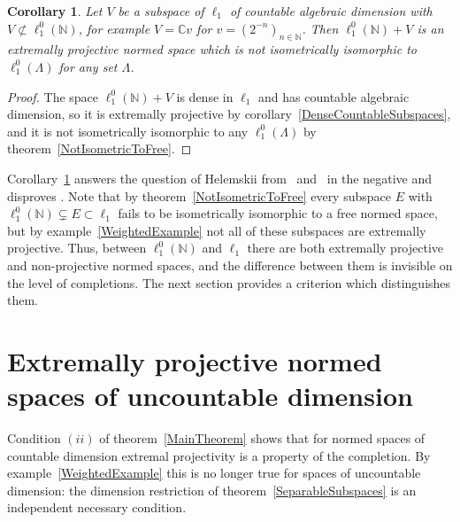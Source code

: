 \documentclass[12pt]{article}
\newtheorem{corollary}[theorem]{Corollary}
\newcommand{\lo}[1]{\ell_1^0(#1)}
\begin{document}
\begin{corollary}\label{CounterexampleCorollary} Let $V$ be a subspace of
    $\ell_1$ of countable algebraic dimension with $V\not\subset\lo{\mathbb{N}}$,
    for example $V=\mathbb{C}v$ for $v={(2^{-n})}_{n\in\mathbb{N}}$. Then
    $\lo{\mathbb{N}}+V$ is an extremally projective normed space which is not
    isometrically isomorphic to $\lo{\Lambda}$ for any set $\Lambda$.
\end{corollary}
\begin{proof} The space $\lo{\mathbb{N}}+V$ is dense in $\ell_1$ and has
    countable algebraic dimension, so it is extremally projective by
    corollary~\ref{DenseCountableSubspaces}, and it is not isometrically
    isomorphic to any $\lo{\Lambda}$ by theorem~\ref{NotIsometricToFree}.
\end{proof}

Corollary~\ref{CounterexampleCorollary} answers the question of Helemskii
from~\cite[section 2]{HelExtrProjSeqAlg} and~\cite[section 1]{HelMetrFrQMod}
in the negative and disproves \cite[conjecture 3.1]{GronLiftProbNormSp}. Note
that by theorem~\ref{NotIsometricToFree} every subspace
$E$ with $\lo{\mathbb{N}}\subsetneq E\subset\ell_1$ fails to be isometrically
isomorphic to a free normed space, but by example~\ref{WeightedExample} not
all of these subspaces are extremally projective. Thus, between
$\lo{\mathbb{N}}$ and $\ell_1$ there are both extremally projective and
non-projective normed spaces, and the difference between them is invisible on
the level of completions. The next section provides a criterion which
distinguishes them.


\section{Extremally projective normed spaces of uncountable
  dimension}\label{SectionUncountable}

Condition $(ii)$ of theorem~\ref{MainTheorem} shows that for normed spaces of
countable dimension extremal projectivity is a property of the completion. By
example~\ref{WeightedExample} this is no longer true for spaces of uncountable
dimension: the dimension restriction of theorem~\ref{SeparableSubspaces} is an
independent necessary condition.
\end{document}
